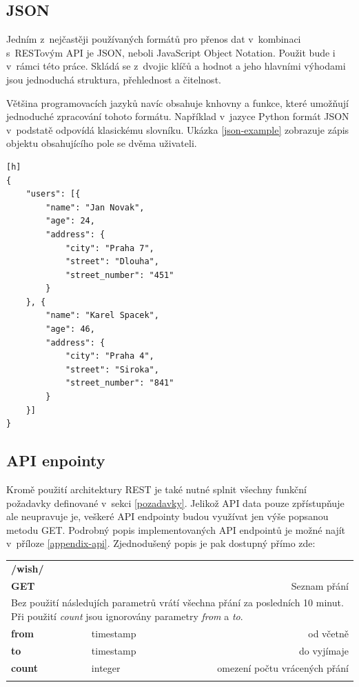 \documentclass[thesis=B,czech]{FITthesis}[2012/06/26]
\begin{document}
	
\subsection{JSON}	
	Jedním z~nejčastěji používaných formátů pro přenos dat v~kombinaci s~RESTovým API je JSON, neboli JavaScript Object Notation. Použit bude i v~rámci této práce. Skládá se z~dvojic klíčů a hodnot a jeho hlavními výhodami jsou jednoduchá struktura, přehlednost a čitelnost\cite{json-web}. 
	
	Většina programovacích jazyků navíc obsahuje knhovny a funkce, které umožňují jednoduché zpracování tohoto formátu. Například v~jazyce Python formát JSON v~podstatě odpovídá klasickému slovníku. Ukázka \ref{json-example} zobrazuje zápis objektu obsahujícího pole se dvěma uživateli. 
\begin{lstlisting}[caption={JSON obsahující pole se dvěma uživateli},label=json-example][h]
{
	"users": [{
		"name": "Jan Novak",
		"age": 24,
		"address": {
			"city": "Praha 7",
			"street": "Dlouha",
			"street_number": "451"
		}
	}, {
		"name": "Karel Spacek",
		"age": 46,
		"address": {
			"city": "Praha 4",
			"street": "Siroka",
			"street_number": "841"
		}
	}]
}
\end{lstlisting}
	
\subsection{API enpointy}
	Kromě použití architektury REST je také nutné splnit všechny funkční požadavky definované v~sekci \ref{pozadavky}. Jelikož API data pouze zpřístupňuje ale neupravuje je, veškeré API endpointy budou využívat jen výše popsanou metodu GET. Podrobný popis implementovaných API endpointů je možné najít v~příloze \ref{appendix-api}. Zjednodušený popis je pak dostupný přímo zde: 
	

\begin{table}[h]
\begin{tabular}{llllr}
\rowcolor[HTML]{EFEFEF}
\large \textbf{/wish/}        &         &                 &        & \multicolumn{1}{l}{}                \\
\rowcolor[HTML]{EFEFEF}
\textbf{GET}          &         &                 &        & Seznam přání                        \\
\multicolumn{5}{l}{\parbox[t]{12.8cm}{Bez použití následujích parametrů vrátí všechna přání za posledních 10 minut. Při použití \textit{count} jsou ignorovány parametry  \textit{from} a \textit{to}.}  } \\
\textbf{from}         &         & timestamp       &        & od včetně                           \\
\textbf{to}           &         & timestamp       &        & do vyjímaje                         \\
\textbf{count}        &         & integer         &        & omezení počtu vrácených přání      \\
 & & & & \\
\end{tabular}
\end{table}
\end{document}
